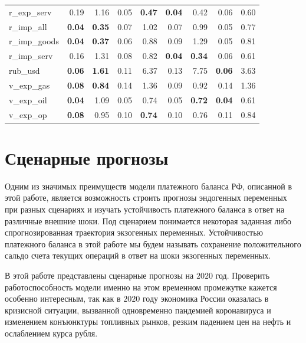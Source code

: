 \documentclass[a4paper, 14pt]{extarticle}
\begin{document}
\begin{center}
\begin{tabular}{l|rr|rr|rr|rr}
		r\_exp\_serv & 0.19 & 1.16 & 0.05 & \textbf{0.47} & \textbf{0.04} & 0.42 & 0.06 & 0.60 \\ 
		r\_imp\_all & \textbf{0.04} & \textbf{0.35} & 0.07 & 1.02 & 0.07 & 0.99 & 0.05 & 0.77 \\ 
		r\_imp\_goods & \textbf{0.04} & \textbf{0.37} & 0.06 & 0.88 & 0.09 & 1.29 & 0.05 & 0.81 \\ 
		r\_imp\_serv & 0.16 & 1.31 & 0.08 & 0.82 & \textbf{0.04} & \textbf{0.34} & 0.06 & 0.61 \\ 
		rub\_usd & \textbf{0.06} & \textbf{1.61} & 0.11 & 6.37 & 0.13 & 7.75 & \textbf{0.06} & 3.63 \\ 
		v\_exp\_gas & \textbf{0.08} & \textbf{0.84} & 0.14 & 1.36 & 0.09 & 0.92 & 0.14 & 1.36 \\ 
		v\_exp\_oil & \textbf{0.04} & 1.09 & 0.05 & 0.74 & 0.05 & \textbf{0.72} & \textbf{0.04} & 0.61 \\ 
		v\_exp\_op & \textbf{0.08} & 0.95 & 0.10 & \textbf{0.74} & 0.10 & 0.76 & 0.11 & 0.84 \\ 
		\bottomrule
	\end{tabular}
\captionsetup{justification=centering,margin=2cm}
\label{tab:4}
\end{center}
\newpage
\section{Сценарные прогнозы}
Одним из значимых преимуществ модели платежного баланса РФ, описанной в этой работе, является возможность строить прогнозы эндогенных переменных при разных сценариях и изучать устойчивость платежного баланса в ответ на различные внешние шоки.
Под сценарием понимается некоторая заданная либо спрогнозированная траектория экзогенных переменных. 
Устойчивостью платежного баланса в этой работе мы будем называть сохранение положительного сальдо счета текущих операций в ответ на шоки экзогенных переменных.

В этой работе представлены сценарные прогнозы на $2020$ год.
Проверить работоспособность модели именно на этом временном промежутке кажется особенно интересным, так как в $2020$ году экономика России оказалась в кризисной ситуации, вызванной одновременно пандемией коронавируса и изменением конъюнктуры топливных рынков, резким падением цен на нефть и ослаблением курса рубля.
\end{document}
